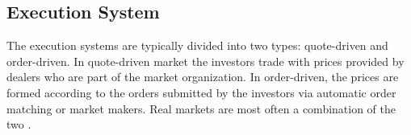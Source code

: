 
\subsection{Execution System}
The execution systems are typically divided into two types:
quote-driven and order-driven. In quote-driven market the investors
trade with prices provided by dealers who are part of the market 
organization. In order-driven, the prices are formed according to
the orders submitted by the investors via automatic order matching 
or market makers. \citep{Baru17} Real markets are most often a combination
of the two \citep{boer05}.
